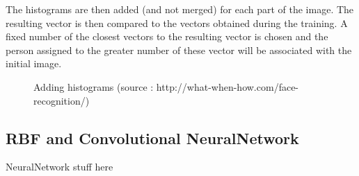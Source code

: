 The histograms are then added (and not merged) for each part of the image. The resulting vector is then compared to the vectors obtained during the training. A fixed number of the closest vectors to the resulting vector is chosen and the person assigned to the greater number of these vector will be associated with the initial image.

\begin{figure}[ht]
\centering
\caption{Adding histograms (source : http://what-when-how.com/face-recognition/)}
\label{Adding histograms}
\end{figure}

\subsection{RBF and Convolutional NeuralNetwork}

NeuralNetwork stuff here
